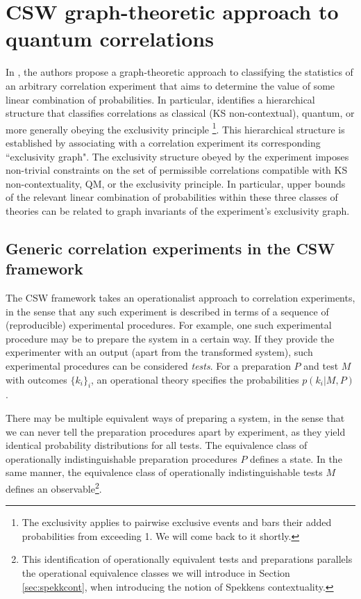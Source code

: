 \chapter{CSW graph-theoretic approach to quantum correlations}
\label{sec:csw}

In \cite{Cabello2014}, the authors propose a graph-theoretic approach to classifying the statistics of an arbitrary correlation experiment that aims to determine the value of some linear combination of probabilities. In particular, \cite{Cabello2014} identifies a hierarchical structure that classifies correlations as classical (KS non-contextual), quantum, or more generally obeying the exclusivity principle \footnote{The exclusivity applies to pairwise exclusive events and bars their added probabilities from exceeding 1. We will come back to it shortly.}. This hierarchical structure is established by associating with a correlation experiment its corresponding ``exclusivity graph". The exclusivity structure obeyed by the experiment imposes non-trivial constraints on the set of permissible correlations compatible with KS non-contextuality, QM, or the exclusivity principle. In particular, upper bounds of the relevant linear combination of probabilities within these three classes of theories can be related to graph invariants of the experiment's exclusivity graph.

\section{Generic correlation experiments in the CSW framework}
\label{sec:correxp}
The CSW framework takes an operationalist approach to correlation experiments, in the sense that any such experiment is described in terms of a sequence of (reproducible) experimental procedures. For example, one such experimental procedure may be to prepare the system in a certain way. If they provide the experimenter with an output (apart from the transformed system), such experimental procedures can be considered \emph{tests}. For a preparation $P$ and test $M$ with outcomes $\{k_i\}_i$, an operational theory specifies the probabilities $p(k_i\vert M,P)$. 

There may be multiple equivalent ways of preparing a system, in the sense that we can never tell the preparation procedures apart by experiment, as they yield identical probability distributions for all tests. The equivalence class of operationally indistinguishable preparation procedures $P$ defines a state. In the same manner, the equivalence class of operationally indistinguishable tests $M$ defines an observable\footnote{This identification of operationally equivalent tests and preparations parallels the operational equivalence classes we will introduce in Section \ref{sec:spekkcont}, when introducing the notion of  Spekkens contextuality.}.


